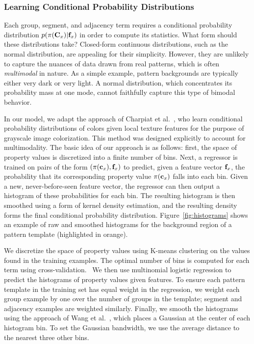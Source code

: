 \subsubsection{Learning Conditional Probability Distributions}
\label{sec:learningPdfs}

Each group, segment, and adjacency term requires a conditional probability distribution $p(\pi(\mathbf{C}_x)|\mathbf{f}_x)$ in order to compute its statistics. What form should these distributions take? Closed-form continuous distributions, such as the normal distribution, are appealing for their simplicity.  However, they are unlikely to capture the nuances of data drawn from real patterns, which is often \emph{multimodal} in nature. As a simple example, pattern backgrounds are typically either very dark or very light. A normal distribution, which concentrates its probability mass at one mode, cannot faithfully capture this type of bimodal behavior.

In our model, we adapt the approach of Charpiat et al.~, who learn conditional probability distributions of colors given local texture features for the purpose of grayscale image colorization. This method was designed explicitly to account for multimodality. The basic idea of our approach is as follows: first, the space of property values is discretized into a finite number of bins. Next, a regressor is trained on pairs of the form $(\pi(\mathbf{c}_x), \mathbf{f}_x)$ to predict, given a feature vector $\mathbf{f}_x$, the probability that its corresponding property value $\pi(\mathbf{c}_x)$ falls into each bin. Given a new, never-before-seen feature vector, the regressor can then output a histogram of these probabilities for each bin. The resulting histogram is then smoothed using a form of kernel density estimation, and the resulting density forms the final conditional probability distribution. Figure~\ref{fig:histograms} shows an example of raw and smoothed histograms for the background region of a pattern template (highlighted in orange).

We discretize the space of property values using K-means clustering on the values found in the training examples. The optimal number of bins is computed for each term using cross-validation.~ We then use multinomial logistic regression to predict the histograms of property values given features. To ensure each pattern template in the training set has equal weight in the regression, we weight each group example by one over the number of groups in the template; segment and adjacency examples are weighted similarly. Finally, we smooth the histograms using the approach of Wang et al.~, which places a Gaussian at the center of each histogram bin. To set the Gaussian bandwidth, we use the average distance to the nearest three other bins.

